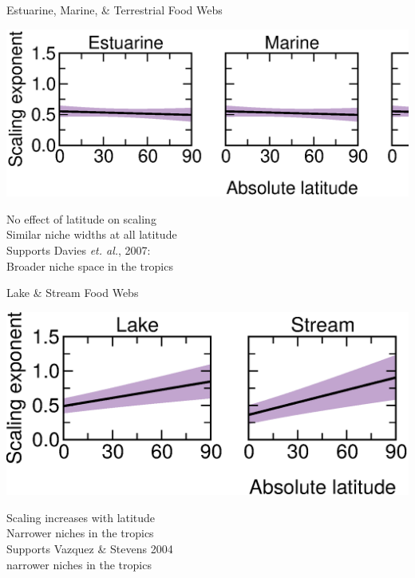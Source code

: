 \documentclass{beamer}
\begin{document}
  \begin{frame}{Estuarine, Marine, \& Terrestrial Food Webs}
    \begin{center}
      \includegraphics*[width=.9\textwidth]{Figures/results/no_effect.eps}

      \vspace{1cm}
      No effect of latitude on scaling\\
      Similar niche widths at all latitude\\
      \vspace{.54cm}      
      Supports Davies \emph{et. al.}, 2007:\\
      Broader niche space in the tropics

    \end{center}
  \end{frame}


  \begin{frame}{Lake \& Stream Food Webs}
    \begin{center}
      \includegraphics*[width=.9\textwidth]{Figures/results/effect_mod.eps}

      \vspace{1cm}
      {\color{white} Scaling increases with latitude\\
      Narrower niches in the tropics\\
      \vspace{.54cm}      
      Supports Vazquez \& Stevens 2004\\}
      {\color{white} narrower niches in the tropics}

    \end{center}
  \end{frame}
\end{document}
